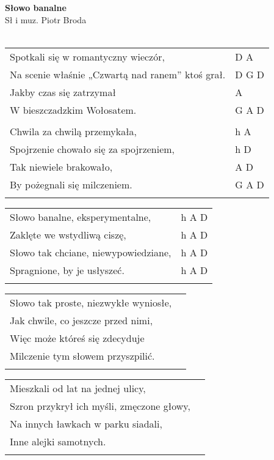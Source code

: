 \documentclass[a5paper]{article}
\begin{document}


\noindent
\fontsize{12pt}{15pt}\selectfont
\textbf{Słowo banalne} \\
\fontsize{8pt}{10pt}\selectfont
Sł i muz. Piotr Broda \\ \\
\fontsize{10pt}{12pt}\selectfont
{}
\begin{tabular}{@{}p{8.50cm}p{3cm}@{}}
\noindent
Spotkali się w romantyczny wieczór, & D A \\
Na scenie właśnie „Czwartą nad ranem” ktoś grał. & D G D \\
Jakby czas się zatrzymał & A \\
W bieszczadzkim Wołosatem. & G A D \\ \\

Chwila za chwilą przemykała, & h A \\
Spojrzenie chowało się za spojrzeniem, & h D \\
Tak niewiele brakowało, & A D \\
By pożegnali się milczeniem. & G A D \\ \\
\end{tabular}

\noindent
\begin{tabular}{@{}p{7.50cm}p{3cm}@{}}
Słowo banalne, eksperymentalne, & h A D \\
Zaklęte we wstydliwą ciszę, & h A D \\
Słowo tak chciane, niewypowiedziane, & h A D \\
Spragnione, by je usłyszeć. & h A D \\ \\
\end{tabular}

\noindent
\begin{tabular}{@{}p{7.50cm}p{3cm}@{}}
Słowo tak proste, niezwykłe wyniosłe,\\
Jak chwile, co jeszcze przed nimi,\\
Więc może któreś się zdecyduje\\
Milczenie tym słowem przyszpilić.\\\\
\end{tabular}

\noindent
\begin{tabular}{@{}p{7.50cm}p{3cm}@{}}
Mieszkali od lat na jednej ulicy,\\
Szron przykrył ich myśli, zmęczone głowy,\\
Na innych ławkach w parku siadali,\\
Inne alejki samotnych.\\\\
\end{tabular}
\end{document}
